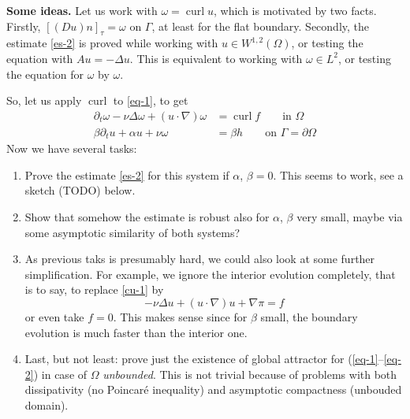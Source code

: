 \documentclass[12pt]{article}
\newcommand{\dert}{\partial_t}
\newcommand{\curl}{\operatorname{curl}}
\newcommand{\entau}[1]{[({#1})n]_{\tau}}
\begin{document}
\par\medskip
{\bf Some ideas.} Let us work with $\omega = \curl u$, which is
motivated by two facts. Firstly, $\entau{Du} = \omega$ on $\Gamma$,
at least for the flat boundary. Secondly, the estimate \eqref{es-2}
is proved while working with $u\in W^{1,2}(\Omega)$, or testing the equation
with $Au = -\Delta u$. This is equivalent to working with
$\omega \in L^2$, or testing the equation for $\omega$ by $\omega$. 
\par
So, let us apply $\curl$ to \eqref{eq-1}, to get
\begin{align}	\label{cu-1}
\dert \omega - \nu \Delta \omega + (u\cdot \nabla)\omega &= \curl f
\qquad\textrm{in $\Omega$}
\\      \label{cu-2}
\beta \dert u + \alpha u + \nu \omega &= \beta h
\qquad\textrm{on $\Gamma = \partial \Omega$}
\end{align}
Now we have several tasks:
\begin{enumerate}
\item Prove the estimate \eqref{es-2} for this system if
$\alpha$, $\beta=0$. This seems to work, see a sketch
(TODO) below.

\item Show that somehow the estimate is robust 
also for $\alpha$, $\beta$ very small, maybe via some
asymptotic similarity of both systems?

\item As previous taks is presumably hard, we could
also look at some further simplification. For example,
we ignore the interior evolution completely, that is to
say, to replace \eqref{cu-1} by
\begin{equation}	\label{eq-1st}
- \nu \Delta u + (u\cdot \nabla) u + \nabla \pi = f
\end{equation}
or even take $f=0$. This makes sense since for $\beta$ small,
the boundary evolution is much faster than the interior one.

\item Last, but not least: prove just the existence of global
attractor for (\ref{eq-1}--\ref{eq-2}) in case of $\Omega$
{\it unbounded}. This is not trivial because of problems 
with both dissipativity (no Poincaré inequality)
and asymptotic compactness (unbouded domain).

\end{enumerate}
\end{document}
